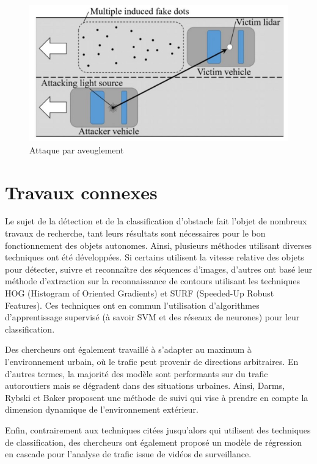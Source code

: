 \documentclass[a4paper]{report}
\begin{document}
\begin{figure}[h]
	\centering
	\includegraphics[width=\textwidth]{img/blinding.png}
	\caption{Attaque par aveuglement\label{blinding}}
\end{figure}

\section{Travaux connexes}

Le sujet de la détection et de la classification d'obstacle fait l'objet de nombreux travaux de recherche, tant leurs résultats sont nécessaires pour le bon fonctionnement des objets autonomes. Ainsi, plusieurs méthodes utilisant diverses techniques ont été développées. Si certains \cite{work1} utilisent la vitesse relative des objets pour détecter, suivre et reconnaître des séquences d'images, d'autres \cite{work2} ont basé leur méthode d'extraction sur la reconnaissance de contours utilisant les techniques HOG (Histogram of Oriented Gradients) et SURF (Speeded-Up Robust Features). Ces techniques ont en commun l'utilisation d'algorithmes d'apprentissage supervisé (à savoir SVM et des réseaux de neurones) pour leur classification.

Des chercheurs ont également travaillé à s'adapter au maximum à l'environnement urbain, où le trafic peut provenir de directions arbitraires. En d'autres termes, la majorité des modèle sont performants sur du trafic autoroutiers mais se dégradent dans des situations urbaines.  Ainsi, Darms, Rybski et Baker proposent \cite{work3} une méthode de suivi qui vise à prendre en compte la dimension dynamique de l'environnement extérieur.

Enfin, contrairement aux techniques citées jusqu'alors qui utilisent des techniques de classification, des chercheurs \cite{work4} ont également proposé un modèle de régression en cascade pour l'analyse de trafic issue de vidéos de surveillance.
\end{document}
